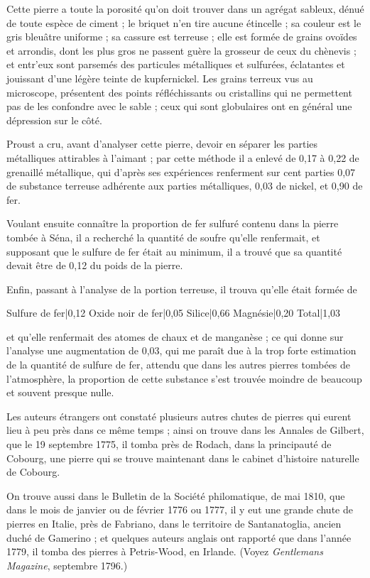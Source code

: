 \documentclass[a4paper, 12pt, oneside, french]{article}
\begin{document}
Cette pierre a toute la porosité qu'on doit trouver dans un agrégat sableux, dénué de toute espèce de ciment ; le briquet n'en tire aucune étincelle ; sa couleur est le gris bleuâtre uniforme ; sa cassure est terreuse ; elle est formée de grains ovoïdes et arrondis, dont les plus gros ne passent guère la grosseur de ceux du chènevis ; et entr'eux sont parsemés des particules métalliques et sulfurées, éclatantes et jouissant d'une légère teinte de kupfernickel. Les grains terreux vus au microscope, présentent des points réfléchissants ou cristallins qui ne permettent pas de les confondre avec le sable ; ceux qui sont globulaires ont en général une dépression sur le côté.

Proust a cru, avant d'analyser cette pierre, devoir en séparer les parties métalliques attirables à l'aimant ; par cette méthode il a enlevé de 0,17 à 0,22 de grenaillé métallique, qui d'après ses expériences renferment sur cent parties 0,07 de substance terreuse adhérente aux parties métalliques, 0,03 de nickel, et 0,90 de fer.

Voulant ensuite connaître la proportion de fer sulfuré contenu dans la pierre tombée à Séna, il a recherché la quantité de soufre qu'elle renfermait, et supposant que le sulfure de fer était au minimum, il a trouvé que sa quantité devait être de 0,12 du poids de la pierre.

Enfin, passant à l'analyse de la portion terreuse, il trouva qu'elle était formée de

Sulfure de fer|0,12  
Oxide noir de fer|0,05  
Silice|0,66  
Magnésie|0,20  
Total|1,03  

et qu'elle renfermait des atomes de chaux et de manganèse ; ce qui donne sur l'analyse une augmentation de 0,03, qui me paraît due à la trop forte estimation de la quantité de sulfure de fer, attendu que dans les autres pierres tombées de l'atmosphère, la proportion de cette substance s'est trouvée moindre de beaucoup et souvent presque nulle.

Les auteurs étrangers ont constaté plusieurs autres chutes de pierres qui eurent lieu à peu près dans ce même temps ; ainsi on trouve dans les Annales de Gilbert, que le 19 septembre 1775, il tomba près de Rodach, dans la principauté de Cobourg, une pierre qui se trouve maintenant dans le cabinet d'histoire naturelle de Cobourg.

On trouve aussi dans le Bulletin de la Société philomatique, de mai 1810, que dans le mois de janvier ou de février 1776 ou 1777, il y eut une grande chute de pierres en Italie, près de Fabriano, dans le territoire de Santanatoglia, ancien duché de Gamerino ; et quelques auteurs anglais ont rapporté que dans l'année 1779, il tomba des pierres à Petris-Wood, en Irlande. (Voyez \emph{Gentlemans Magazine}, septembre 1796.)
\end{document}
